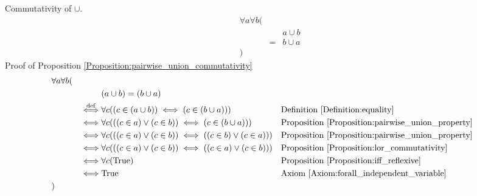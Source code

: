 \begin{prop}
\label{Proposition:pairwise_union_commutativity}
Commutativity of $\cup$.
\begin{align*}
& \forall a \forall b ( \\
& & & a \cup b \\
& & = & b \cup a \\
& )
\end{align*}
Proof of Proposition \ref{Proposition:pairwise_union_commutativity}
\begin{align*}
& \forall a \forall b ( \\
& & & (a \cup b) = (b \cup a) \\
& & \overset{\operatorname{def}}{\iff} & \forall c ((c \in (a \cup b)) \iff (c \in (b \cup a)))
& & \text{Definition \ref{Definition:equality}} \\
& & \iff & \forall c (((c \in a) \lor (c \in b)) \iff (c \in (b \cup a)))
& & \text{Proposition \ref{Proposition:pairwise_union_property}} \\
& & \iff & \forall c (((c \in a) \lor (c \in b)) \iff ((c \in b) \lor (c \in a)))
& & \text{Proposition \ref{Proposition:pairwise_union_property}} \\
& & \iff & \forall c (((c \in a) \lor (c \in b)) \iff ((c \in a) \lor (c \in b)))
& & \text{Proposition \ref{Proposition:lor_commutativity}} \\
& & \iff & \forall c (\text{True})
& & \text{Proposition \ref{Proposition:iff_reflexive}} \\
& & \iff & \text{True}
& & \text{Axiom \ref{Axiom:forall_independent_variable}} \\
& )
\end{align*}
\end{prop}

